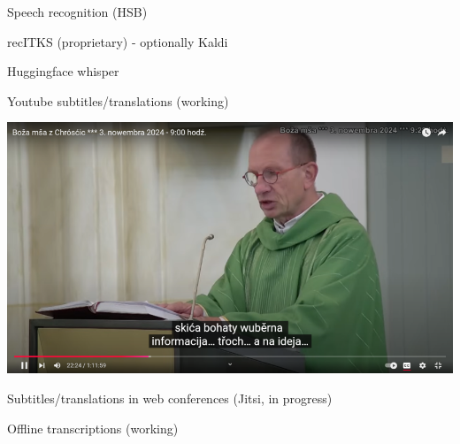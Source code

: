   \begin{block}{Speech recognition (HSB)}


    recITKS (proprietary) - optionally Kaldi
        

    Huggingface whisper


    Youtube subtitles/translations (working)

    \includegraphics[width=\colwidth]{citanje.png}

    Subtitles/translations in web conferences (Jitsi, in progress)
    
    Offline transcriptions (working)
    
  \end{block}
